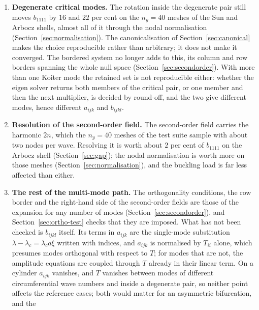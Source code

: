 \documentclass[11pt,a4paper]{article}
\begin{document}
\begin{enumerate}\itemsep3pt
  \item \textbf{Degenerate critical modes.}  The rotation inside the
        degenerate pair still moves $b_{1111}$ by $16$ and $22$ per cent on
        the $n_y = 40$ meshes of the Sun and Arbocz shells, almost all of it
        through the nodal normalisation
        (Section~\ref{sec:normalisation}).  The canonicalisation of
        Section~\ref{sec:canonical} makes the choice reproducible rather than
        arbitrary; it does not make it converged.  The bordered system no
        longer adds to this, its column and row borders spanning the whole
        null space (Section~\ref{sec:secondorder}).  With more than one Koiter
        mode the retained set is not reproducible either: whether the eigen
        solver returns both members of the critical pair, or one member and
        then the next multiplier, is decided by round-off, and the two give
        different modes, hence different $a_{ijk}$ and $b_{ijkl}$.
  \item \textbf{Resolution of the second-order field.}  The second-order field
        carries the harmonic $2n$, which the $n_y = 40$ meshes of the test
        suite sample with about two nodes per wave.  Resolving it is worth
        about $2$ per cent of $b_{1111}$ on the Arbocz shell
        (Section~\ref{sec:gap}); the nodal normalisation is worth more on
        those meshes (Section~\ref{sec:normalisation}), and the buckling load
        is far less affected than either.
  \item \textbf{The rest of the multi-mode path.}  The orthogonality
        conditions, the row border and the right-hand side of the
        second-order fields are those of the expansion for any number of
        modes (Section~\ref{sec:secondorder}), and
        Section~\ref{sec:ortho-test} checks that they are imposed.  What has
        not been checked is $b_{ijkl}$ itself.  Its terms in $a_{ijk}$ are
        the single-mode substitution $\lambda - \lambda_c = \lambda_c a\xi$
        written with indices, and $a_{ijk}$ is normalised by $T_{ii}$ alone,
        which presumes modes orthogonal with respect to $T$; for modes that
        are not, the amplitude equations are coupled through $T$ already in
        their linear term.  On a cylinder $a_{ijk}$ vanishes, and $T$
        vanishes between modes of different circumferential wave numbers and
        inside a degenerate pair, so neither point affects the reference
        cases; both would matter for an asymmetric bifurcation, and the

\end{enumerate}
\end{document}
